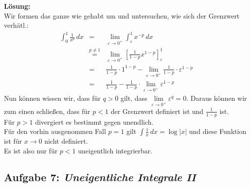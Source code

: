 \documentclass[11pt,a4paper,ngerman]{article}
\begin{document}
\begin{enumerate}[(i)]
		\textbf{Lösung:}\\
		Wir formen das ganze wie gehabt um und untersuchen, wie sich der Grenzwert verhätl.:
		$$\begin{array}{rcl}
			\int_0^1 \frac{1}{x^p} \, dx &=& \underset{\varepsilon \rightarrow 0^+}{\lim} \int_\varepsilon^1 x^{-p} \, dx\\
				&\stackrel{p\not=1}{=}& \underset{\varepsilon \rightarrow 0^+}{\lim} \left[ \frac{1}{1-p} x^{1-p}\right]_\varepsilon^1\\
				&=& \frac{1}{1-p}\cdot 1^{1-p} - \underset{\varepsilon \rightarrow 0^+}{\lim} \frac{1}{1-p} \cdot \varepsilon^{1-p} \\
                &=& \frac{1}{1-p} - \frac{1}{1-p} \cdot \underset{\varepsilon \rightarrow 0^+}{\lim} \varepsilon^{1-p} 
		\end{array}$$
		Nun können wissen wir, dass für $q>0$ gilt, dass $\underset{\varepsilon \rightarrow 0^+}{\lim} \varepsilon^q = 0$.
		Daraus können wir zum einen schließen, dass für $p<1$ der Grenzwert definiert ist und $\frac{1}{1-p}$ ist.\\
		Für $p>1$ divergiert es bestimmt gegen unendlich.\\
		Für den vorhin ausgenommen Fall $p=1$ gilt $\int \frac{1}{x} \, dx = \log |x|$ und diese Funktion ist für $x \rightarrow 0$ nicht definiert.\\
		Es ist also nur für $p<1$ uneigentlich integrierbar.
\end{enumerate}


\subsection*{Aufgabe 7: \mdseries\itshape Uneigentliche Integrale II}
\end{document}
